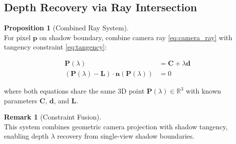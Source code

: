 \documentclass[12pt]{article}
\theoremstyle{definition}
\newtheorem{proposition}{Proposition}[section]
\newtheorem{remark}{Remark}[section]
\begin{document}
\subsection{Depth Recovery via Ray Intersection}

\begin{proposition}[Combined Ray System] ~\\
For pixel $\mathbf{p}$ on shadow boundary, combine camera ray \eqref{eq:camera_ray} with tangency constraint \eqref{eq:tangency}:

\vspace{0.25em}
\begin{equation}
\boxed{
\begin{aligned}
\mathbf{P}(\lambda) &= \mathbf{C} + \lambda \mathbf{d} \\
(\mathbf{P}(\lambda) - \mathbf{L}) \cdot \mathbf{n}(\mathbf{P}(\lambda)) &= 0
\end{aligned}
} \label{eq:combined_system}
\end{equation}
\vspace{0.25em}

where both equations share the same 3D point $\mathbf{P}(\lambda) \in \mathbb{R}^3$ with known parameters $\mathbf{C}$, $\mathbf{d}$, and $\mathbf{L}$.
\end{proposition}

\begin{remark}[Constraint Fusion] ~\\
This system combines geometric camera projection with shadow tangency, enabling depth $\lambda$ recovery from single-view shadow boundaries.
\end{remark}





\end{document}
